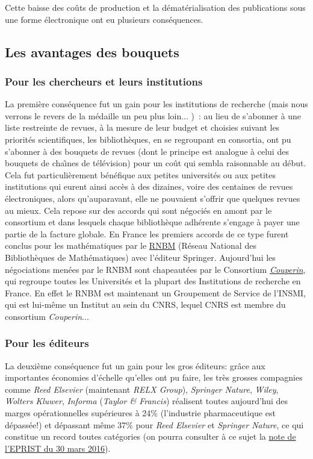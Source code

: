 Cette baisse des co{\^u}ts de production et la d{\'e}mat{\'e}rialisation des publications sous une forme {\'e}lectronique ont eu plusieurs cons{\'e}quences. 

\subsection{Les avantages des bouquets}

\subsubsection{Pour les chercheurs et leurs institutions} 
La premi{\`e}re cons{\'e}quence fut un gain pour les institutions de recherche (mais nous verrons le revers de la m{\'e}daille un peu plus loin... )~:
au lieu de s'abonner {\`a} une liste restreinte de revues, {\`a} la mesure de leur budget et choisies suivant les priorit{\'e}s scientifiques,
les biblioth{\`e}ques, en se regroupant en consortia, ont pu s'abonner {\`a} des bouquets de revues (dont le principe est analogue {\`a}
celui des bouquets de cha{\^\i}nes de t{\'e}l{\'e}vision) pour un co{\^u}t qui sembla raisonnable au d{\'e}but. Cela fut particuli{\`e}rement b{\'e}n{\'e}fique aux
petites universit{\'e}s ou aux petites institutions qui eurent ainsi acc{\`e}s {\`a} des dizaines, voire des centaines de revues {\'e}lectroniques,
alors qu'auparavant, elle ne pouvaient s'offrir que quelques revues au mieux. Cela repose sur des accords qui sont n{\'e}goci{\'e}s en amont
par le consortium et dans lesquels chaque biblioth{\`e}que adh{\'e}rente s'engage {\`a} payer une partie de la facture globale. En France les
premiers accords de ce type furent conclus pour les math{\'e}matiques par le \href{http://www.rnbm.org/}{RNBM}
(R{\'e}seau National des Biblioth{\`e}ques de Math{\'e}matiques)
avec l'{\'e}diteur Springer. Aujourd'hui les n{\'e}gociations men{\'e}es par le RNBM sont chapeaut{\'e}es par le Consortium
\href{http://www.couperin.org/}{\emph{Couperin}}, qui regroupe
toutes les Universit{\'e}s et la plupart des Institutions de recherche en France. En effet le RNBM est maintenant un Groupement de Service de
l'INSMI, qui est lui-m{\^e}me un Institut au sein du CNRS, lequel CNRS est membre du consortium \emph{Couperin}...


\subsubsection{Pour les {\'e}diteurs}
La deuxi{\`e}me cons{\'e}quence fut un gain pour les gros {\'e}diteurs: gr{\^a}ce aux importantes {\'e}conomies d'{\'e}chelle qu'elles ont pu faire,
les tr{\`e}s grosses
compagnies comme \emph{Reed Elsevier} (maintenant \emph{RELX Group}), \emph{Springer Nature}, \emph{Wiley}, \emph{Wolters Kluwer},
\emph{Informa} (\emph{Taylor \& Francis})
r{\'e}alisent toutes aujourd'hui des marges op{\'e}rationnelles sup{\'e}rieures {\`a} 24\% (l'industrie pharmaceutique est d{\'e}pass{\'e}e!)
et d{\'e}passant m{\^e}me 37\% pour
\emph{Reed Elsevier} et \emph{Springer Nature}, ce qui constitue un record toutes cat{\'e}gories (on pourra consulter  {\`a} ce sujet la
\href{http://www.eprist.fr/wp-content/uploads/2016/03/I-IST_16_R{\'e}sultatsFinanciers2015EditionScientifique.pdf}{note de l'EPRIST du 30 mars 2016}).

